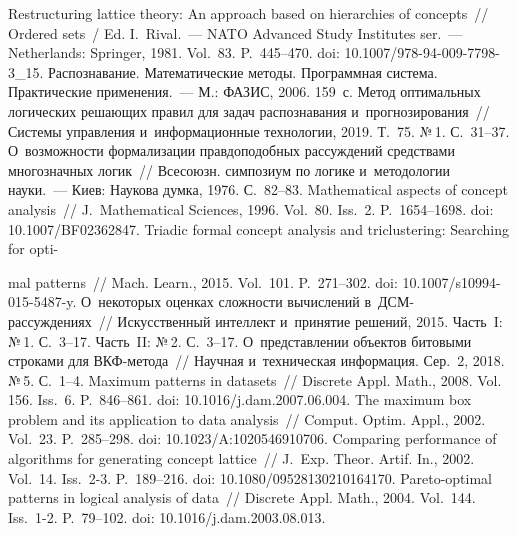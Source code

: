 \begin{multicols}{2}
{{\begin{thebibliography}{99}
 Restructuring lattice theory: An approach based on hierarchies of concepts~// 
Ordered sets~/ Ed. I.~Rival.~--- NATO Advanced Study Institutes ser.~--- Netherlands: 
Springer, 1981. Vol.~83. P.~445--470. doi: 10.1007/978-94-009-7798-3\_15.
 Рас\-по\-зна\-ва\-ние. Математические 
методы. Программная сис\-те\-ма. Практические применения.~--- М.: ФАЗИС, 2006. 159~с. 
 Метод оптимальных логических ре\-ша\-ющих правил для задач 
рас\-по\-зна\-ва\-ния и~прогнозирования~// Сис\-те\-мы управ\-ле\-ния и~информационные 
технологии, 2019. Т.~75. №\,1. С.~31--37.
 О~возможности формализации прав\-до\-по\-доб\-ных рас\-суж\-де\-ний 
средствами многозначных логик~// Всесоюзн. симпозиум по логике и~методологии науки.~--- 
Киев: Наукова думка, 1976. С.~82--83.
 Mathematical aspects of concept analysis~// J.~Mathematical Sciences, 1996. Vol.~80. 
Iss.~2. P.~1654--1698. doi: 10.1007/BF02362847.
 Triadic formal concept analysis and 
triclustering: Searching for opti-\linebreak\vspace*{-12pt}

\pagebreak

\noindent
mal patterns~// Mach. Learn., 2015. Vol.~101. P.~271--302.
doi: 10.1007/s10994-015-5487-y.
 О~некоторых оценках слож\-ности вы\-чис\-ле\-ний  
в~ДСМ-рас\-суж\-де\-ни\-ях~// Искусственный интеллект и~принятие решений, 2015. 
Часть~I: №\,1. С.~3--17. Часть~II: №\,2. С.~3--17.
 О~пред\-став\-ле\-нии объектов битовыми строками для  
ВКФ-ме\-то\-да~// Научная и~техническая информация. Сер.~2, 2018. №\,5. С.~1--4.
 Maximum patterns in datasets~// Discrete Appl. 
Math., 2008. Vol. 156. Iss.~6. P.~846--861. doi: 10.1016/j.dam.2007.06.004.
 The maximum box problem and 
its application to data analysis~// Comput. Optim. Appl., 2002. Vol.~23. P.~285--298. doi: 
10.1023/A:1020546910706.
 Comparing performance of algorithms for generating 
concept lattice~// J.~Exp. Theor. Artif. In., 2002. Vol.~14. Iss.~2-3. P.~189--216. doi: 
10.1080/09528130210164170.
 Pareto-optimal 
patterns in logical analysis of data~// Discrete Appl. Math., 2004. Vol.~144. Iss.~1-2. P.~79--102.  
doi: 10.1016/j.dam.2003.08.013.
\end{thebibliography}

 }
 }

\end{multicols}


